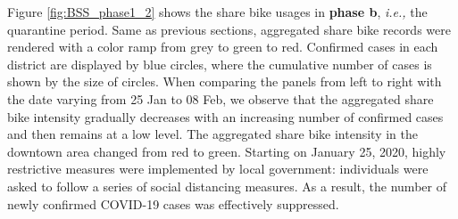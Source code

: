 \documentclass[ijgi,submit,moreauthors,pdftex]{Definitions/mdpi}
\begin{document}
Figure \ref{fig:BSS_phase1_2} shows the share bike usages in \textbf{phase b}, \textit{i.e.,} the quarantine period.
Same as previous sections, aggregated share bike records were rendered with a color ramp from grey to green to red.
Confirmed cases in each district are displayed by blue circles, where the cumulative number of cases is shown by the size of circles.
When comparing the panels from left to right with the date varying from 25 Jan to 08 Feb, we observe that the aggregated share bike intensity gradually decreases with an increasing number of confirmed cases and then remains at a low level.
The aggregated share bike intensity in the downtown area changed from red to green.
Starting on January 25, 2020, highly restrictive measures were implemented by local government: individuals were asked to follow a series of social distancing measures.
As a result, the number of newly confirmed COVID-19 cases was effectively suppressed.
\end{document}
